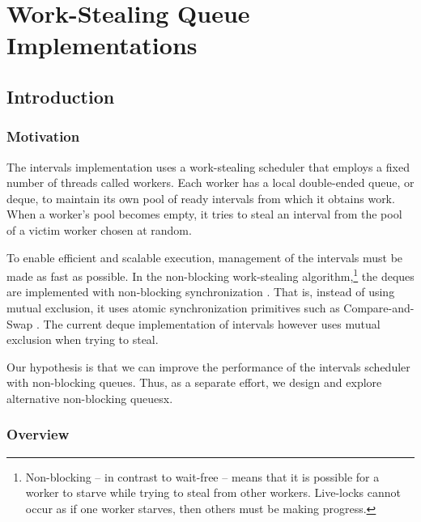 
\part{Work-Stealing Queue Implementations}
\label{part:queues}

\chapter{Introduction}
\label{chap:queues-introduction}

\section{Motivation}
\label{sec:queues-intro-motivation}

The intervals implementation uses a work-stealing scheduler that
employs a fixed number of threads called workers. Each worker has a
local double-ended queue, or deque, to maintain its own pool of ready
intervals from which it obtains work. When a worker's pool becomes
empty, it tries to steal an interval from the pool of a victim worker
chosen at random.

To enable efficient and scalable execution, management of the
intervals must be made as fast as possible. In the non-blocking
work-stealing algorithm,\footnote{Non-blocking -- in contrast to
  wait-free \cite{Herlihy1991} -- means that it is possible for a
  worker to starve while trying to steal from other
  workers. Live-locks cannot occur as if one worker starves, then
  others must be making progress.} the deques are implemented with
non-blocking synchronization \cite{Arora2001}. That is, instead of
using mutual exclusion, it uses atomic synchronization primitives such
as Compare-and-Swap \cite{Moir1997}. The current deque implementation
of intervals however uses mutual exclusion when trying to steal.

Our hypothesis is that we can improve the performance of the intervals
scheduler with non-blocking queues. Thus, as a separate effort, we
design and explore alternative non-blocking queuesx.

\section{Overview}
\label{sec:queues-intro-overview}

